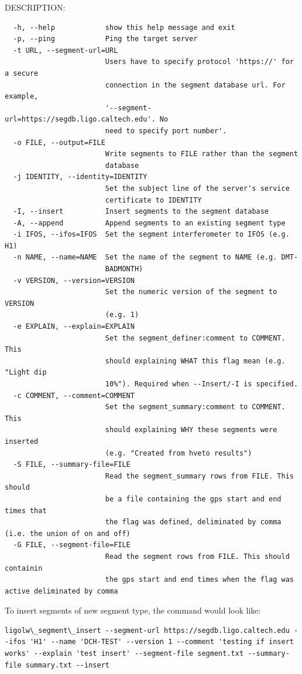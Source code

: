 DESCRIPTION:
\begin{verbatim}
  -h, --help            show this help message and exit
  -p, --ping            Ping the target server
  -t URL, --segment-url=URL
                        Users have to specify protocol 'https://' for a secure
                        connection in the segment database url. For example,
                        '--segment-url=https://segdb.ligo.caltech.edu'. No
                        need to specify port number'.
  -o FILE, --output=FILE
                        Write segments to FILE rather than the segment
                        database
  -j IDENTITY, --identity=IDENTITY
                        Set the subject line of the server's service
                        certificate to IDENTITY
  -I, --insert          Insert segments to the segment database
  -A, --append          Append segments to an existing segment type
  -i IFOS, --ifos=IFOS  Set the segment interferometer to IFOS (e.g. H1)
  -n NAME, --name=NAME  Set the name of the segment to NAME (e.g. DMT-
                        BADMONTH)
  -v VERSION, --version=VERSION
                        Set the numeric version of the segment to VERSION
                        (e.g. 1)
  -e EXPLAIN, --explain=EXPLAIN
                        Set the segment_definer:comment to COMMENT. This
                        should explaining WHAT this flag mean (e.g. "Light dip
                        10%"). Required when --Insert/-I is specified.
  -c COMMENT, --comment=COMMENT
                        Set the segment_summary:comment to COMMENT. This
                        should explaining WHY these segments were inserted
                        (e.g. "Created from hveto results")
  -S FILE, --summary-file=FILE
                        Read the segment_summary rows from FILE. This should
                        be a file containing the gps start and end times that
                        the flag was defined, deliminated by comma (i.e. the union of on and off)
  -G FILE, --segment-file=FILE
                        Read the segment rows from FILE. This should containin
                        the gps start and end times when the flag was active deliminated by comma
\end{verbatim}

To insert segments of new segment type, the command would look like:
\begin{verbatim}
ligolw\_segment\_insert --segment-url https://segdb.ligo.caltech.edu --ifos 'H1' --name 'DCH-TEST' --version 1 --comment 'testing if insert works' --explain 'test insert' --segment-file segment.txt --summary-file summary.txt --insert
\end{verbatim}

